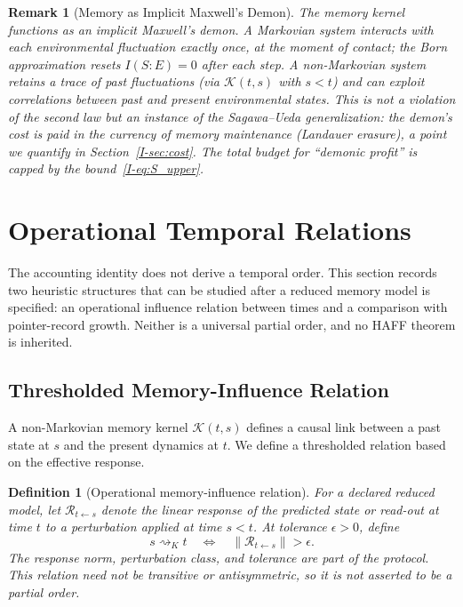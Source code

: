 \documentclass[12pt,a4paper,openany]{book}
\newtheorem{definition}[theorem]{Definition}
\newtheorem{remark}[theorem]{Remark}
\begin{document}
\begin{remark}[Memory as Implicit Maxwell's Demon]
\label{I-rem:demon}
The memory kernel functions as an \emph{implicit Maxwell's demon}.
A Markovian system interacts with each environmental fluctuation
exactly once, at the moment of contact; the Born approximation
resets $I(S{:}E) = 0$ after each step.
A non-Markovian system retains a trace of past fluctuations
(via $\mathcal{K}(t,s)$ with $s < t$) and can exploit
correlations between past and present environmental states.
This is not a violation of the second law but an instance of
the Sagawa--Ueda generalization: the demon's cost is paid in
the currency of memory maintenance (Landauer erasure), a point
we quantify in Section~\ref{I-sec:cost}.
The total budget for ``demonic profit'' is capped by the
bound~\eqref{I-eq:S_upper}.
\end{remark}

\section{Operational Temporal Relations}
\label{I-sec:arrow}

The accounting identity does not derive a temporal order.  This section
records two heuristic structures that can be studied after a reduced
memory model is specified: an operational influence relation between
times and a comparison with pointer-record growth.  Neither is a
universal partial order, and no HAFF theorem is inherited.

\subsection{Thresholded Memory-Influence Relation}

A non-Markovian memory kernel $\mathcal{K}(t,s)$ defines a
causal link between a past state at $s$ and the present dynamics
at $t$.
We define a thresholded relation based on the effective response.

\begin{definition}[Operational memory-influence relation]
\label{I-def:memory_order}
For a declared reduced model, let $\mathcal R_{t\leftarrow s}$ denote
the linear response of the predicted state or read-out at time $t$ to
a perturbation applied at time $s<t$.  At tolerance $\epsilon>0$, define
\begin{equation}
\label{I-eq:memory_order}
s\rightsquigarrow_K t
\quad\Longleftrightarrow\quad
\|\mathcal R_{t\leftarrow s}\|>\epsilon .
\end{equation}
The response norm, perturbation class, and tolerance are part of the
protocol.  This relation need not be transitive or antisymmetric, so it
is not asserted to be a partial order.
\end{definition}
\end{document}

